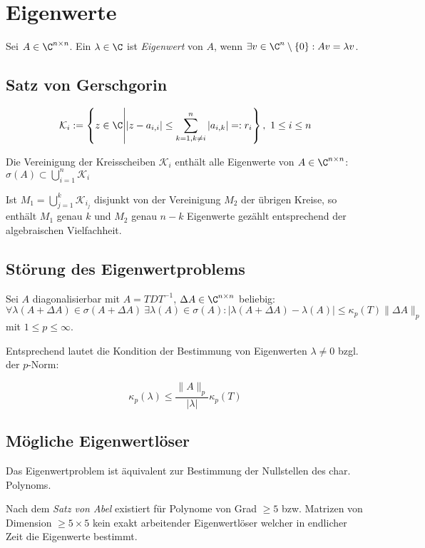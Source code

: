 \section*{Eigenwerte}

Sei $A \in \C^{n \times n}$. Ein $\lambda \in \C$ ist \emph{Eigenwert} von $A$, wenn $\exists v \in \C^n\setminus\{0\} : Av = \lambda v$.

\subsection*{Satz von Gerschgorin}

\[ \mathcal{K}_i := \left\{ z \in \C \middle| |z-a_{i,i}| \leq \sum_{k=1, k\neq i}^n |a_{i,k}| =: r_i \right\}, \ 1 \leq i \leq n \]

Die Vereinigung der Kreisscheiben $\mathcal{K}_i$ enthält alle Eigenwerte von $A \in \C^{n \times n}$: $\sigma(A) \subset \bigcup_{i=1}^n \mathcal{K}_i$

\spacing

Ist $M_1 = \bigcup_{j=1}^k \mathcal{K}_{i_j}$ disjunkt von der Vereinigung $M_2$ der übrigen Kreise, so enthält $M_1$ genau $k$ und $M_2$ genau $n-k$ Eigenwerte gezählt entsprechend der algebraischen Vielfachheit.

\subsection*{Störung des Eigenwertproblems}

Sei $A$ diagonalisierbar mit $A= TDT^{-1}$, $\Delta A \in \C^{n \times n}$ beliebig: $\forall \lambda(A+\Delta A) \in \sigma(A+\Delta A) \ \exists \lambda(A) \in \sigma(A) : |\lambda(A+\Delta A) - \lambda(A)| \leq \kappa_p(T) \|\Delta A\|_p$ mit $1 \leq p \leq \infty$.

\spacing

Entsprechend lautet die Kondition der Bestimmung von Eigenwerten $\lambda \neq 0$ bzgl. der $p$-Norm:

\[ \kappa_p(\lambda) \leq \frac{\|A\|_p}{|\lambda|} \kappa_p(T) \]

\subsection*{Mögliche Eigenwertlöser}

Das Eigenwertproblem ist äquivalent zur Bestimmung der Nullstellen des char. Polynoms.

Nach dem \emph{Satz von Abel} existiert für Polynome von Grad $\geq 5$ bzw. Matrizen von Dimension $\geq 5\times5$ kein exakt arbeitender Eigenwertlöser welcher in endlicher Zeit die Eigenwerte bestimmt.

